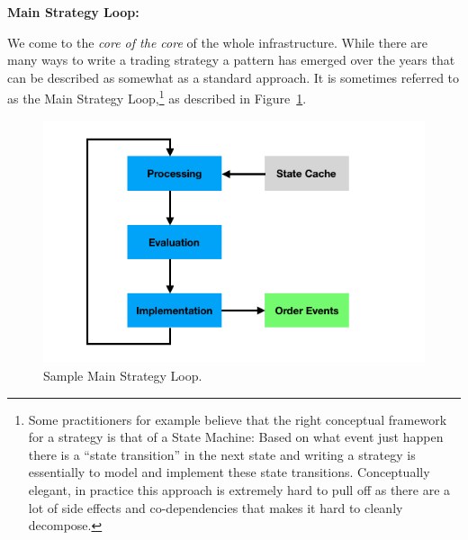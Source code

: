\noindent\textbf{Main Strategy Loop:} 


We come to the \emph{core of the core} of the whole infrastructure. While there are many ways to write a trading strategy a pattern has emerged over the years that can be described as somewhat as a standard approach. It is sometimes referred to as the Main Strategy Loop,\footnote{Some practitioners for example believe that the right conceptual framework for a strategy is that of a State Machine: Based on what event just happen there is a ``state transition'' in the next state and writing a strategy is essentially to model and implement these state transitions. Conceptually elegant, in practice this approach is extremely hard to pull off as there are a lot of side effects and co-dependencies that makes it hard to cleanly decompose.} as described in Figure~\ref{fig:MainLoop}. 

	\begin{figure}[!ht]
	\centering
	\includegraphics[width=\textwidth]{chapters/chapter_tech/figures/MainLoop.png} 
	\caption{Sample Main Strategy Loop. \label{fig:MainLoop}}
	\end{figure}
	
